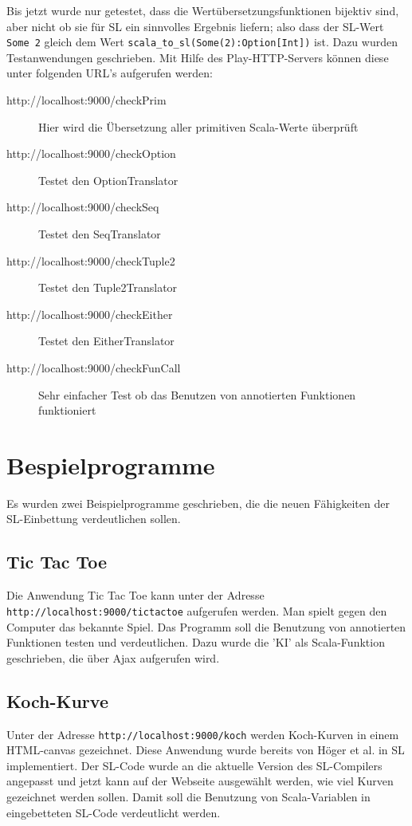 \documentclass[12pt,bibtotoc]{scrreprt}
\begin{document}
Bis jetzt wurde nur getestet, dass die Wertübersetzungsfunktionen bijektiv sind, aber nicht ob sie für SL ein sinnvolles Ergebnis liefern; also dass der SL-Wert \lstinline!Some 2! gleich dem Wert \lstinline!scala_to_sl(Some(2):Option[Int])! ist. Dazu wurden Testanwendungen geschrieben. Mit Hilfe des Play-HTTP-Servers können diese unter folgenden URL's aufgerufen werden:

\begin{description}
 \item[http://localhost:9000/checkPrim] Hier wird die Übersetzung aller primitiven Scala-Werte überprüft
 \item[http://localhost:9000/checkOption] Testet den OptionTranslator
 \item[http://localhost:9000/checkSeq] Testet den SeqTranslator
 \item[http://localhost:9000/checkTuple2] Testet den Tuple2Translator
 \item[http://localhost:9000/checkEither] Testet den EitherTranslator
 \item[http://localhost:9000/checkFunCall] Sehr einfacher Test ob das Benutzen von annotierten Funktionen funktioniert
\end{description}

\section{Bespielprogramme}

Es wurden zwei Beispielprogramme geschrieben, die die neuen Fähigkeiten der SL-Einbettung verdeutlichen sollen.

\subsection{Tic Tac Toe}

Die Anwendung Tic Tac Toe kann unter der Adresse \lstinline!http://localhost:9000/tictactoe! aufgerufen werden. Man spielt gegen den Computer das bekannte Spiel. Das Programm soll die Benutzung von annotierten Funktionen testen und verdeutlichen. Dazu wurde die 'KI' als Scala-Funktion geschrieben, die über Ajax aufgerufen wird.

\subsection{Koch-Kurve}
\label{subsec:koch-curve}

Unter der Adresse \lstinline!http://localhost:9000/koch! werden Koch-Kurven in einem HTML-canvas gezeichnet. Diese Anwendung wurde bereits von Höger et al. in SL implementiert\cite{Hoger2013}. Der SL-Code wurde an die aktuelle Version des SL-Compilers angepasst und jetzt kann auf der Webseite ausgewählt werden, wie viel Kurven gezeichnet werden sollen. Damit soll die Benutzung von Scala-Variablen in eingebetteten SL-Code verdeutlicht werden.


{}

\end{document}
